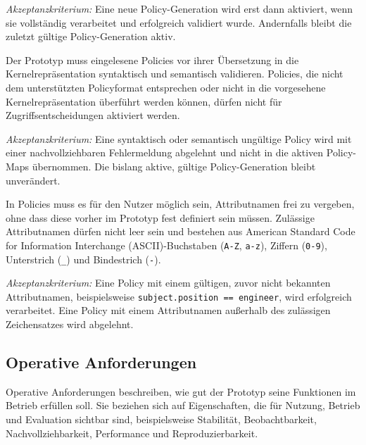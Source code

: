 \begin{description}
    \textit{Akzeptanzkriterium:} Eine neue Policy-Generation wird erst dann aktiviert, wenn sie vollständig verarbeitet und erfolgreich validiert wurde. Andernfalls bleibt die zuletzt gültige Policy-Generation aktiv.

    \item[FA-09 Validierung von Policies:]
    Der Prototyp muss eingelesene Policies vor ihrer Übersetzung in die Kernelrepräsentation syntaktisch und semantisch validieren.
    Policies, die nicht dem unterstützten Policyformat entsprechen oder nicht in die vorgesehene Kernelrepräsentation überführt werden können, dürfen nicht für Zugriffsentscheidungen aktiviert werden.
    
    \textit{Akzeptanzkriterium:} Eine syntaktisch oder semantisch ungültige Policy wird mit einer nachvollziehbaren Fehlermeldung abgelehnt und nicht in die aktiven Policy-Maps übernommen. Die bislang aktive, gültige Policy-Generation bleibt unverändert.

    \item[FA-10 Beliebige Attributnamen:]
    In Policies muss es für den Nutzer möglich sein, Attributnamen frei zu vergeben, ohne dass diese vorher im Prototyp fest definiert sein müssen.
    Zulässige Attributnamen dürfen nicht leer sein und bestehen aus American Standard Code for Information Interchange (ASCII)-Buchstaben (\texttt{A-Z}, \texttt{a-z}), Ziffern (\texttt{0-9}), Unterstrich (\texttt{\_}) und Bindestrich (\texttt{-}).
    
    \textit{Akzeptanzkriterium:} Eine Policy mit einem gültigen, zuvor nicht bekannten Attributnamen, beispielsweise \texttt{subject.position == \textquotedbl{}engineer\textquotedbl{}}, wird erfolgreich verarbeitet. Eine Policy mit einem Attributnamen außerhalb des zulässigen Zeichensatzes wird abgelehnt.

\end{description}

\subsection{Operative Anforderungen}

Operative Anforderungen beschreiben, wie gut der Prototyp seine Funktionen im Betrieb erfüllen soll. 
Sie beziehen sich auf Eigenschaften, die für Nutzung, Betrieb und Evaluation sichtbar sind, beispielsweise Stabilität, Beobachtbarkeit, Nachvollziehbarkeit, Performance und Reproduzierbarkeit.

